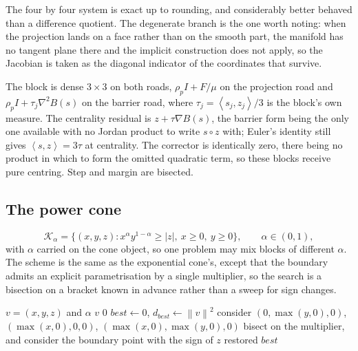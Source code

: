 \documentclass[a4paper,11pt]{book}
\theoremstyle{plain}
\theoremstyle{definition}
\theoremstyle{remark}
\numberwithin{equation}{chapter}
\numberwithin{algorithm}{chapter}
\newcommand{\norm}[1]{\left\|#1\right\|}
\newcommand{\inner}[2]{\left\langle #1, #2 \right\rangle}
\newcommand{\Kpow}{\mathcal{K}_{\alpha}}
\begin{document}
	The four by four system is exact up to rounding, and considerably better
	behaved than a difference quotient. The degenerate branch is the one worth
	noting: when the projection lands on a face rather than on the smooth part,
	the manifold has no tangent plane there and the implicit construction does not
	apply, so the Jacobian is taken as the diagonal indicator of the coordinates
	that survive.

	The block is dense $3\times3$ on both roads, $\rho_pI+F/\mu$ on the projection
	road and $\rho_pI+\tau_j\nabla^2B(s)$ on the barrier road, where
	$\tau_j=\inner{s_j}{z_j}/3$ is the block's own measure. The centrality
	residual is $z+\tau\nabla B(s)$, the barrier form being the only one available
	with no Jordan product to write $s\circ z$ with; Euler's identity still gives
	$\inner{s}{z}=3\tau$ at centrality. The corrector is identically zero, there
	being no product in which to form the omitted quadratic term, so these blocks
	receive pure centring. Step and margin are bisected.

	\subsection{The power cone}

	\[
	\Kpow=\bigl\{(x,y,z):x^{\alpha}y^{1-\alpha}\geq|z|,\ x\geq0,\ y\geq0\bigr\},
	\qquad\alpha\in(0,1),
	\]
	with $\alpha$ carried on the cone object, so one problem may mix blocks of
	different $\alpha$. The scheme is the same as the exponential cone's, except
	that the boundary admits an explicit parametrisation by a single multiplier,
	so the search is a bisection on a bracket known in advance rather than a sweep
	for sign changes.

	\begin{algorithm}[H]
		\caption{Projection onto the power cone}
		\begin{algorithmic}[1]
			\Require $v=(x,y,z)$ and $\alpha$
			\If{$v\in\Kpow$} \State \Return $v$
			\ElsIf{$-v\in\Kpow^*$} \State \Return $0$ \EndIf
			\State $best\gets0$, \quad $d_{best}\gets\norm{v}^2$
			\State consider $(0,\max(y,0),0)$, $(\max(x,0),0,0)$,
			$(\max(x,0),\max(y,0),0)$ 
			\State bisect on the multiplier, and consider the boundary point with
			the sign of $z$ restored
			\EndIf
			\State \Return $best$
		\end{algorithmic}
	\end{algorithm}
\end{document}
